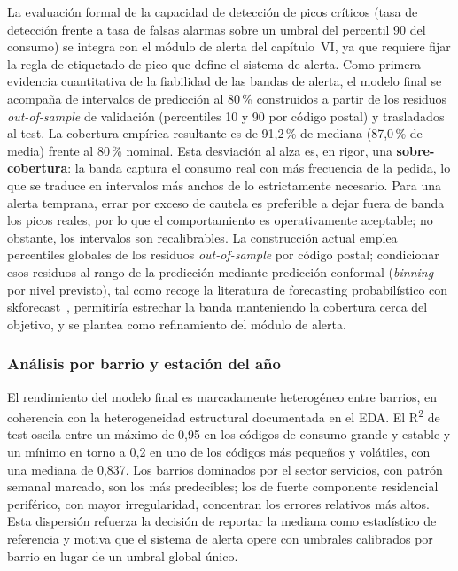 \documentclass[12pt, a4paper]{article}
\begin{document}
La evaluación formal de la capacidad de detección de picos críticos (tasa de detección frente a tasa de falsas alarmas sobre un umbral del percentil 90 del consumo) se integra con el módulo de alerta del capítulo~VI, ya que requiere fijar la regla de etiquetado de pico que define el sistema de alerta. Como primera evidencia cuantitativa de la fiabilidad de las bandas de alerta, el modelo final se acompaña de intervalos de predicción al 80\,\% construidos a partir de los residuos \textit{out-of-sample} de validación (percentiles 10 y 90 por código postal) y trasladados al test. La cobertura empírica resultante es de 91,2\,\% de mediana (87,0\,\% de media) frente al 80\,\% nominal. Esta desviación al alza es, en rigor, una \textbf{sobre-cobertura}: la banda captura el consumo real con más frecuencia de la pedida, lo que se traduce en intervalos más anchos de lo estrictamente necesario. Para una alerta temprana, errar por exceso de cautela es preferible a dejar fuera de banda los picos reales, por lo que el comportamiento es operativamente aceptable; no obstante, los intervalos son recalibrables. La construcción actual emplea percentiles globales de los residuos \textit{out-of-sample} por código postal; condicionar esos residuos al rango de la predicción mediante predicción conformal (\textit{binning} por nivel previsto), tal como recoge la literatura de forecasting probabilístico con skforecast~\cite{skforecast}, permitiría estrechar la banda manteniendo la cobertura cerca del objetivo, y se plantea como refinamiento del módulo de alerta.

\subsubsection{Análisis por barrio y estación del año}

El rendimiento del modelo final es marcadamente heterogéneo entre barrios, en coherencia con la heterogeneidad estructural documentada en el EDA. El R\textsuperscript{2} de test oscila entre un máximo de 0,95 en los códigos de consumo grande y estable y un mínimo en torno a 0,2 en uno de los códigos más pequeños y volátiles, con una mediana de 0,837. Los barrios dominados por el sector servicios, con patrón semanal marcado, son los más predecibles; los de fuerte componente residencial periférico, con mayor irregularidad, concentran los errores relativos más altos. Esta dispersión refuerza la decisión de reportar la mediana como estadístico de referencia y motiva que el sistema de alerta opere con umbrales calibrados por barrio en lugar de un umbral global único.
\end{document}

